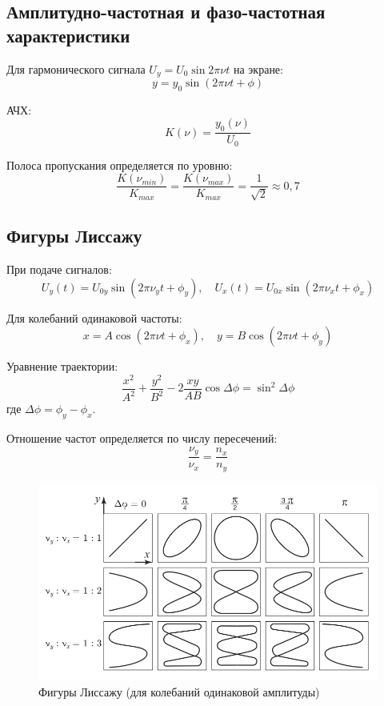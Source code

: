 \documentclass[a4paper, 12pt]{article}
\begin{document}
\subsection*{Амплитудно-частотная и фазо-частотная характеристики}

Для гармонического сигнала $U_y = U_0\sin 2\pi\nu t$ на экране:
\begin{equation}
y = y_0\sin(2\pi\nu t + \phi)
\end{equation}

АЧХ:
\begin{equation}
K(\nu) = \frac{y_0(\nu)}{U_0}
\end{equation}

Полоса пропускания определяется по уровню:
\begin{equation}
\frac{K(\nu_{min})}{K_{max}} = \frac{K(\nu_{max})}{K_{max}} = \frac{1}{\sqrt{2}} \approx 0,7
\end{equation}

\subsection*{Фигуры Лиссажу}

При подаче сигналов:
\begin{equation}
U_y(t) = U_{0y}\sin(2\pi\nu_yt + \phi_y), \quad U_x(t) = U_{0x}\sin(2\pi\nu_xt + \phi_x)
\end{equation}

Для колебаний одинаковой частоты:
\begin{equation}
x = A\cos(2\pi\nu t + \phi_x), \quad y = B\cos(2\pi\nu t + \phi_y)
\end{equation}

Уравнение траектории:
\begin{equation}
\frac{x^2}{A^2} + \frac{y^2}{B^2} - 2\frac{xy}{AB}\cos\Delta\phi = \sin^2\Delta\phi
\end{equation}
где $\Delta\phi = \phi_y - \phi_x$.

Отношение частот определяется по числу пересечений:
\begin{equation}
\frac{\nu_y}{\nu_x} = \frac{n_x}{n_y}
\end{equation}

\begin{figure}[h]
\centering
\includegraphics[width=0.8\linewidth]{рис 5.png}
\caption{Фигуры Лиссажу (для колебаний одинаковой амплитуды)
}
\label{fig:voltage_current}
\end{figure}
\end{document}
